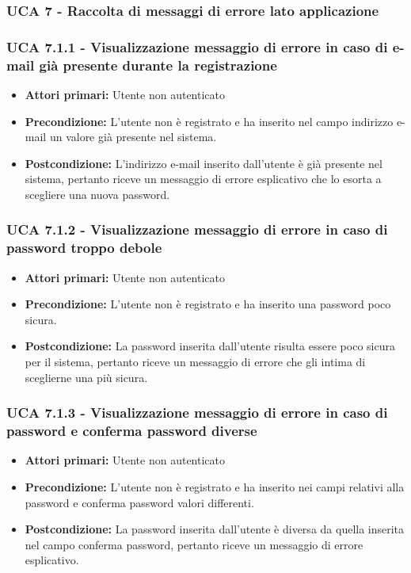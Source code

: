 \subsubsection{UCA 7 - Raccolta di messaggi di errore lato applicazione}
\subsubsection{UCA 7.1.1 - Visualizzazione messaggio di errore in caso di e-mail già presente durante la registrazione}%
\begin{itemize}
\item \textbf{Attori primari:} Utente non autenticato
\item \textbf{Precondizione:} L'utente non è registrato e ha inserito nel campo indirizzo e-mail un valore già presente nel sistema.
\item \textbf{Postcondizione:} L'indirizzo e-mail inserito dall'utente è già presente nel sistema, pertanto riceve un messaggio di errore esplicativo che lo esorta a scegliere una nuova password.
\end{itemize}

\subsubsection{UCA 7.1.2 - Visualizzazione messaggio di errore in caso di password troppo debole}%
\begin{itemize}
\item \textbf{Attori primari:} Utente non autenticato
\item \textbf{Precondizione:} L'utente non è registrato e ha inserito una password poco sicura.
\item \textbf{Postcondizione:} La password inserita dall'utente risulta essere poco sicura per il sistema, pertanto riceve un messaggio di errore che gli intima di sceglierne una più sicura.
\end{itemize}


\subsubsection{UCA 7.1.3 - Visualizzazione messaggio di errore in caso di password e conferma password diverse}%
\begin{itemize}
\item \textbf{Attori primari:} Utente non autenticato
\item \textbf{Precondizione:} L'utente non è registrato e ha inserito nei campi relativi alla password e conferma password valori differenti.
\item \textbf{Postcondizione:} La password inserita dall'utente è diversa da quella inserita nel campo conferma password, pertanto riceve un messaggio di errore esplicativo.
\end{itemize}

